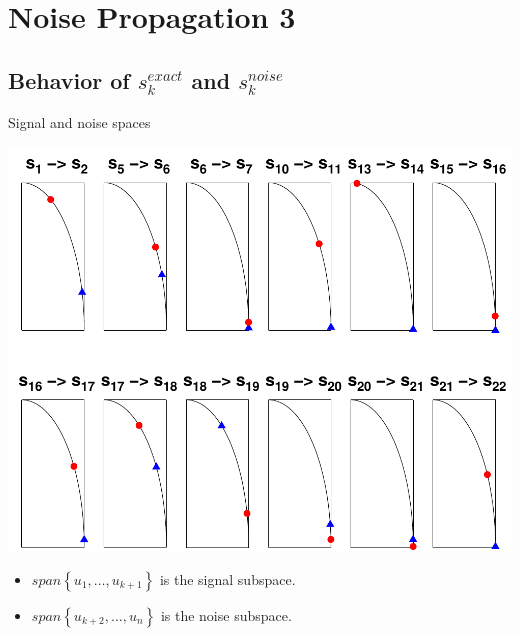 \documentclass{beamer}
\begin{document}
\section{Noise Propagation 3}
\subsection{Behavior of $s_{k}^{exact}$ and $s_{k}^{noise}$}
\begin{frame}{Signal and noise spaces}
  \begin{center}
    \includegraphics[width=0.55\linewidth]{figures/run1/signal_noise_space}
  \end{center}
  \begin{itemize}
    \item $span\left\{u_{1},\ldots,u_{k+1}\right\}$ is the signal subspace.
    \item $span\left\{u_{k+2},\ldots,u_{n}\right\}$ is the noise subspace.
  \end{itemize}
\end{frame}
\end{document}
